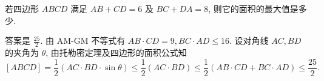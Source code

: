 \begin{prob}
\label{prob:prob-6}
若四边形 $ABCD$ 满足 $AB + CD = 6$ 及 $BC + DA = 8$,
则它的面积的最大值是多少.
\end{prob}

\begin{soln}
答案是 $\boxed{\tfrac{25}{2}.}$
由 AM-GM 不等式有 $AB\cdot CD = 9, BC\cdot AD \le 16$.
设对角线 $AC, BD$ 的夹角为 $\theta$,
由托勒密定理及四边形的面积公式知
\[
[ABCD] = \frac{1}{2}(AC\cdot BD \cdot \sin\theta)
\le \frac{1}{2}(AC\cdot BD) \le \frac{1}{2}(AB\cdot CD + BC\cdot AD)
\le \frac{25}{2}.
\]
\end{soln}
